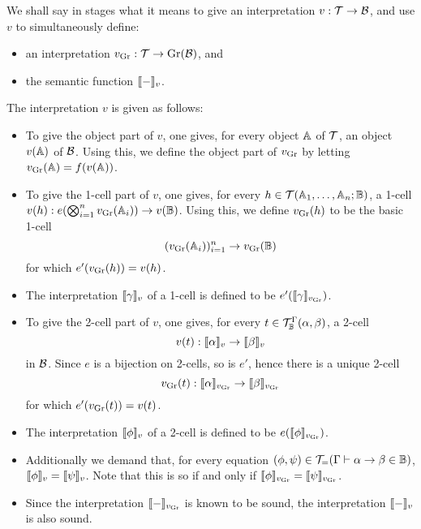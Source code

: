 \documentclass{robinthesisdraft}
\begin{document}
We shall say in stages what it means to give an interpretation $v: {\mathcal{T}}\to\mathcal{B}$,
and use $v$ to simultaneously define:
\begin{itemize}
	\item an interpretation $v_{\mathrm{Gr}}: {\mathcal{T}} \to \mathrm{Gr}(\mathcal{B})$, and
	\item the semantic function $\semint{-}$.
\end{itemize}
The interpretation $v$ is given as follows:
\begin{itemize}
	\item To give the object part of $v$, one gives, for every
	object $\mathbb{A}$ of ${\mathcal{T}}$, an object $v(\mathbb{A})$ of $\mathcal{B}$. Using
	this, we define the object part of $v_{\mathrm{Gr}}$ by letting
	$v_{\mathrm{Gr}}(\mathbb{A}) = f(v(\mathbb{A}))$.
	\item To give the 1-cell part of $v$, one gives,
	for every $h\in{\mathcal{T}}(\mathbb{A}_{1}, \dots, \mathbb{A}_{n}; \mathbb{B})$,
	a 1-cell $v(h): e(\bigotimes_{i=1}^{n}v_{\mathrm{Gr}}(\mathbb{A}_{i})) \to v(\mathbb{B})$.
	Using this, we define $v_{\mathrm{Gr}}(h)$ to be the basic 1-cell
	\[
		(v_{\mathrm{Gr}}(\mathbb{A}_{i}))_{i=1}^{n} \to v_{\mathrm{Gr}}(\mathbb{B})
	\]
	for which $e'(v_{\mathrm{Gr}}(h)) = v(h)$.
	\item The interpretation $\semint{\gamma}$ of a 1-cell is
	defined to be $e'(\semint[v_{\Gr}]{\gamma})$.
	\item To give the 2-cell part of $v$, one gives,
	for every $t \in {\mathcal{T}}^{\Gamma}_{\mathbb{B}}(\alpha, \beta)$,
	a 2-cell
	\[
		v(t): \semint{\alpha} \to \semint{\beta}
	\] in $\mathcal{B}$.
	Since $e$ is a bijection on 2-cells, so is $e'$, hence there is a unique 2-cell
	\[
		v_{\Gr}(t): \semint[v_{\Gr}]{\alpha} \to \semint[v_{\Gr}]{\beta}
	\]
	for which $e'(v_{\mathrm{Gr}}(t)) = v(t)$.
	\item The interpretation $\semint{\phi}$ of a 2-cell is
	defined to be $e(\semint[v_{\Gr}]{\phi})$.
	\item Additionally we demand that, for every
	equation $(\phi, \psi) \in {\mathcal{T}}_{=}(\Gamma\vdash\alpha\to\beta\in\mathbb{B})$,
	$\semint{\phi} = \semint{\psi}$. Note that this is so if and only if
	$\semint[v_{\Gr}]{\phi} = \semint[v_{\Gr}]{\psi}$.
	\item Since the interpretation $\semint[v_{\Gr}]{-}$ is known to be sound,
	the interpretation $\semint{-}$ is also sound.
\end{itemize}
\end{document}
